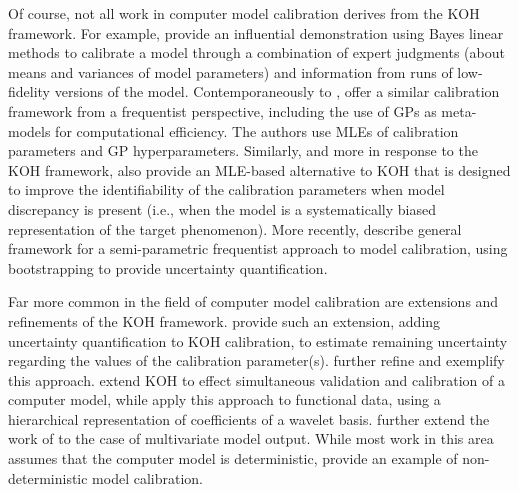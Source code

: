 \documentclass[12pt]{article}
\begin{document}
Of course, not all work in computer model calibration derives from the KOH framework.
For example, \citet{Craig1997} provide an influential demonstration using Bayes linear methods to calibrate a model through a combination of expert judgments (about means and variances of model parameters) and information from runs of low-fidelity versions of the model.
Contemporaneously to \citet{Kennedy2001}, \citet{Cox2001} offer a similar calibration framework from a frequentist perspective, including the use of GPs as meta-models for computational efficiency. 
The authors use MLEs of calibration parameters and GP hyperparameters.
Similarly, and more in response to the KOH framework, \citet{Loeppky2006} also provide an MLE-based alternative to KOH that is designed to improve the identifiability of the calibration parameters when model discrepancy is present (i.e., when the model is a systematically biased representation of the target phenomenon).
More recently, \citet{Wong2014} describe general framework for a semi-parametric frequentist approach to model calibration, using bootstrapping to provide uncertainty quantification.

Far more common in the field of computer model calibration are extensions and refinements of the KOH framework.
\citet{Higdon2004} provide such an extension, adding uncertainty quantification to KOH calibration, to estimate remaining uncertainty regarding the values of the calibration parameter(s).
\citet{Williams2006} further refine and exemplify this approach.
\citet{Bayarri2007a} extend KOH to effect simultaneous validation and calibration of a computer model, while \citet{Bayarri2007b} apply this approach to functional data, using a hierarchical representation of coefficients of a wavelet basis.
\citet{Paulo2012} further extend the work of \citet{Bayarri2007a} to the case of multivariate model output.
While most work in this area assumes that the computer model is deterministic, \citet{Pratola2018} provide an example of non-deterministic model calibration.
\end{document}
